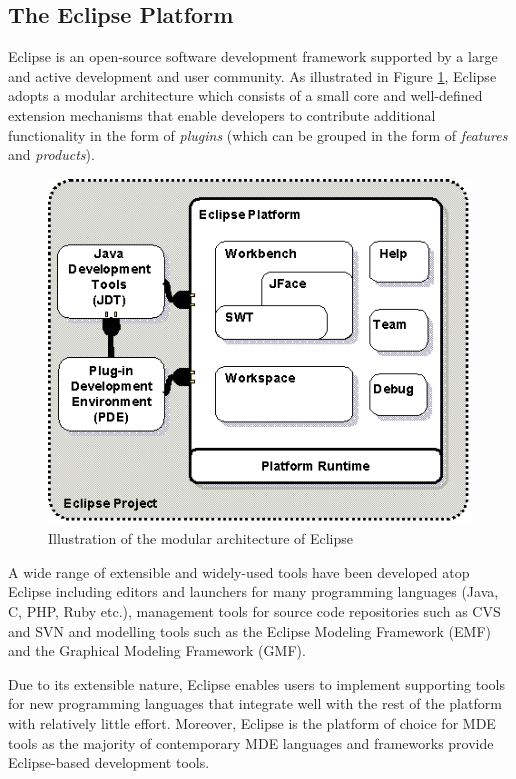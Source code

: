 \subsection{The Eclipse Platform} 

Eclipse is an open-source software development framework supported by a large and active development and user community. As illustrated in Figure \ref{fig:EclipseArchitecture}, Eclipse adopts a modular architecture which consists of a small core and well-defined extension mechanisms that enable developers to contribute additional functionality in the form of \emph{plugins} (which can be grouped in the form of \emph{features} and \emph{products}).

\begin{figure}
	\centering
		\includegraphics[width=1\textwidth]{images/EclipseArchitecture}
	\caption{Illustration of the modular architecture of Eclipse \cite{EclipseArchitecture}}
	\label{fig:EclipseArchitecture}
\end{figure}

A wide range of extensible and widely-used tools have been developed atop Eclipse including editors and launchers for many programming languages (Java, C, PHP, Ruby etc.), management tools for source code repositories such as CVS and SVN and modelling tools such as the Eclipse Modeling Framework (EMF) and the Graphical Modeling Framework (GMF). 

Due to its extensible nature, Eclipse enables users to implement supporting tools for new programming languages that integrate well with the rest of the platform with relatively little effort. Moreover, Eclipse is the platform of choice for MDE tools as the majority of contemporary MDE languages and frameworks provide Eclipse-based development tools. 

